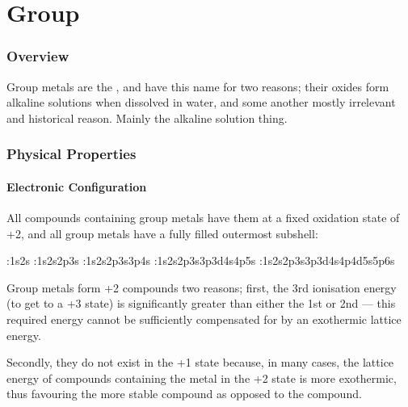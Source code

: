 

\newcommand{\rtwo}{\bld{\romannum{II}}}

\pagebreak
\part{Group }

	\section{Overview}

		Group \rtwo{} metals are the , and have this name for two reasons; their oxides form alkaline solutions
		when dissolved in water, and some another mostly irrelevant and historical reason. Mainly the alkaline solution thing.


	\section{Physical Properties}

		\subsection{Electronic Configuration}

			All compounds containing group \rtwo{} metals have them at a fixed oxidation state of +2, and all group \rtwo{} metals have a
			fully filled outermost  subshell:

			\tabto{0mm}:\tabto{10mm}1s\sps{2}2s
			\tabto{0mm}:\tabto{10mm}1s2s2p3s
			\tabto{0mm}:\tabto{10mm}1s\sps{2}2s2p3s3p4s
			\tabto{0mm}:\tabto{10mm}1s\sps{2}2s2p3s3p3d4s4p5s
			\tabto{0mm}:\tabto{10mm}1s\sps{2}2s2p3s3p3d4s4p4d5s5p6s


			Group \rtwo{} metals form +2 compounds two reasons; first, the 3rd ionisation energy (to get to a +3 state) is significantly greater
			than either the 1st or 2nd --- this required energy cannot be sufficiently compensated for by an exothermic lattice energy.

			Secondly, they do not exist in the +1 state because, in many cases, the lattice energy of compounds containing the metal in the +2
			state is more exothermic, thus favouring the more stable  compound as opposed to the  compound.

